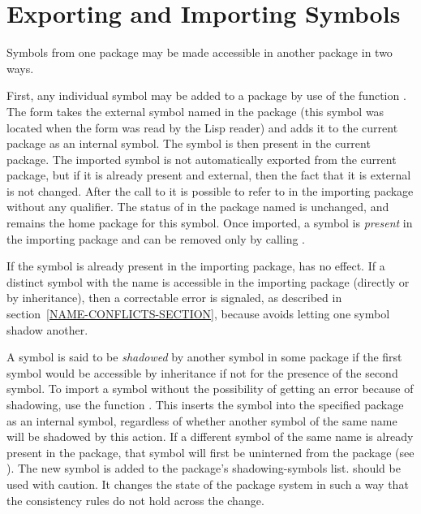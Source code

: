 \section{Exporting and Importing Symbols} 
\label{EXPORT-IMPORT-SECTION}

Symbols from one package may be made accessible in another package in
two ways.

First, any individual symbol may be added to a package by use
of the function .  The form  takes
the external symbol named  in the  package (this
symbol was located when the form was read by the Lisp reader) and adds
it to the current package as an internal symbol.  The symbol is then
present in the current package.  The imported symbol is
not automatically exported from the current package, but if it is
already present and external, then the fact that it
is external is not changed.  After the call to
 it is possible to refer to  in the importing package
without any qualifier.  The status of  in the package named
 is unchanged, and  remains the home package for
this symbol.  Once imported, a symbol is \emph{present} in the
importing package and can be removed only by calling .

If the symbol is already present in the importing package, 
has no effect.  If a distinct symbol with the name  is
accessible in the importing package (directly or by inheritance), then a
correctable error is signaled, as described in
section~\ref{NAME-CONFLICTS-SECTION}, because  avoids letting
one symbol shadow another.

A symbol is said to be \emph{shadowed} by another symbol in
some package if the first symbol would be accessible by inheritance
if not for the presence of the second symbol.
To import a symbol without the possibility
of getting an
error because of shadowing,
use the function .  This inserts
the symbol into the specified package as an internal symbol, regardless
of whether another symbol of the same name will be shadowed by this
action.
If a different symbol of the same name is already present
in the package, that symbol will first be uninterned from the package
(see ).  The new symbol is
added to the package's shadowing-symbols list.  
should be used with caution.  It changes the state of the package system
in such a way that the consistency rules do not hold across the change.

